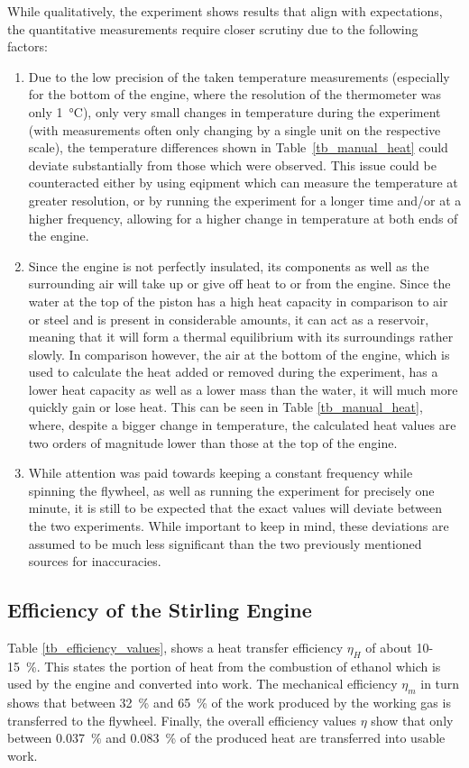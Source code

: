 \documentclass[titlepage]{article}
\begin{document}
While qualitatively, the experiment shows results that align with expectations, the quantitative measurements require closer scrutiny due to the following factors:
%
\begin{enumerate}
    \item Due to the low precision of the taken temperature measurements (especially for the bottom of the engine, where the resolution of the thermometer was only 1~°C), only very small changes in temperature during the experiment (with measurements often only changing by a single unit on the respective scale), the temperature differences shown in Table~\ref{tb_manual_heat} could deviate substantially from those which were observed. This issue could be counteracted either by using eqipment which can measure the temperature at greater resolution, or by running the experiment for a longer time and/or at a higher frequency, allowing for a higher change in temperature at both ends of the engine.
    \item Since the engine is not perfectly insulated, its components as well as the surrounding air will take up or give off heat to or from the engine. Since the water at the top of the piston has a high heat capacity in comparison to air or steel and is present in considerable amounts, it can act as a reservoir, meaning that it will form a thermal equilibrium with its surroundings rather slowly. In comparison however, the air at the bottom of the engine, which is used to calculate the heat added or removed during the experiment, has a lower heat capacity as well as a lower mass than the water, it will much more quickly gain or lose heat. This can be seen in Table \ref{tb_manual_heat}, where, despite a bigger change in temperature, the calculated heat values are two orders of magnitude lower than those at the top of the engine.
    \item While attention was paid towards keeping a constant frequency while spinning the flywheel, as well as running the experiment for precisely one minute, it is still to be expected that the exact values will deviate between the two experiments. While important to keep in mind, these deviations are assumed to be much less significant than the two previously mentioned sources for inaccuracies.
\end{enumerate}

\newpage
\subsection{Efficiency of the Stirling Engine}
Table \ref{tb_efficiency_values}, shows a heat transfer efficiency \(\eta_H\) of about 10-15~\%. This states the portion of heat from the combustion of ethanol which is used by the engine and converted into work. The mechanical efficiency \(\eta_m\) in turn shows that between 32~\% and 65~\% of the work produced by the working gas is transferred to the flywheel. Finally, the overall efficiency values \(\eta\) show that only between 0.037~\% and 0.083~\% of the produced heat are transferred into usable work.
\end{document}
